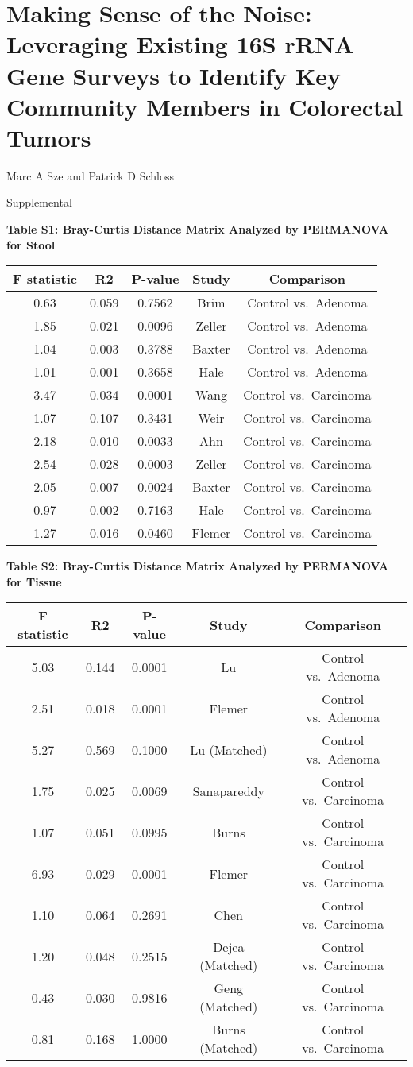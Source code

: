 \documentclass[12pt,]{article}
\title{}
\author{}
\date{}
\begin{document}
\section{Making Sense of the Noise: Leveraging Existing 16S rRNA Gene
Surveys to Identify Key Community Members in Colorectal
Tumors}\label{making-sense-of-the-noise-leveraging-existing-16s-rrna-gene-surveys-to-identify-key-community-members-in-colorectal-tumors}

\vspace{10mm}

\begin{center}
Marc A Sze and Patrick D Schloss

\vspace{10mm}

Supplemental
\end{center}

\newpage

\textbf{Table S1: Bray-Curtis Distance Matrix Analyzed by PERMANOVA for
Stool}

\begin{longtable}[]{@{}ccccc@{}}
\toprule
F statistic & R2 & P-value & Study & Comparison\tabularnewline
\midrule
\endhead
0.63 & 0.059 & 0.7562 & Brim & Control vs.~Adenoma\tabularnewline
1.85 & 0.021 & 0.0096 & Zeller & Control vs.~Adenoma\tabularnewline
1.04 & 0.003 & 0.3788 & Baxter & Control vs.~Adenoma\tabularnewline
1.01 & 0.001 & 0.3658 & Hale & Control vs.~Adenoma\tabularnewline
3.47 & 0.034 & 0.0001 & Wang & Control vs.~Carcinoma\tabularnewline
1.07 & 0.107 & 0.3431 & Weir & Control vs.~Carcinoma\tabularnewline
2.18 & 0.010 & 0.0033 & Ahn & Control vs.~Carcinoma\tabularnewline
2.54 & 0.028 & 0.0003 & Zeller & Control vs.~Carcinoma\tabularnewline
2.05 & 0.007 & 0.0024 & Baxter & Control vs.~Carcinoma\tabularnewline
0.97 & 0.002 & 0.7163 & Hale & Control vs.~Carcinoma\tabularnewline
1.27 & 0.016 & 0.0460 & Flemer & Control vs.~Carcinoma\tabularnewline
\bottomrule
\end{longtable}

\newpage

\textbf{Table S2: Bray-Curtis Distance Matrix Analyzed by PERMANOVA for
Tissue}

\begin{longtable}[]{@{}ccccc@{}}
\toprule
F statistic & R2 & P-value & Study & Comparison\tabularnewline
\midrule
\endhead
5.03 & 0.144 & 0.0001 & Lu & Control vs.~Adenoma\tabularnewline
2.51 & 0.018 & 0.0001 & Flemer & Control vs.~Adenoma\tabularnewline
5.27 & 0.569 & 0.1000 & Lu (Matched) & Control
vs.~Adenoma\tabularnewline
1.75 & 0.025 & 0.0069 & Sanapareddy & Control
vs.~Carcinoma\tabularnewline
1.07 & 0.051 & 0.0995 & Burns & Control vs.~Carcinoma\tabularnewline
6.93 & 0.029 & 0.0001 & Flemer & Control vs.~Carcinoma\tabularnewline
1.10 & 0.064 & 0.2691 & Chen & Control vs.~Carcinoma\tabularnewline
1.20 & 0.048 & 0.2515 & Dejea (Matched) & Control
vs.~Carcinoma\tabularnewline
0.43 & 0.030 & 0.9816 & Geng (Matched) & Control
vs.~Carcinoma\tabularnewline
0.81 & 0.168 & 1.0000 & Burns (Matched) & Control
vs.~Carcinoma\tabularnewline
\bottomrule
\end{longtable}
\end{document}
